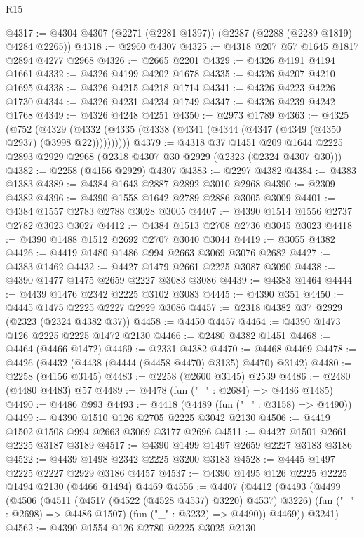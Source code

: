 \begin{lexlean}{R15}
\begin{coremodule}
@4317 := @4304 @4307 (@2271 (@2281 @1397)) (@2287 (@2288 (@2289 @1819) @4284 @2265))
@4318 := @2960 @4307
@4325 := @4318 @207 @57 @1645 @1817 @2894 @4277 @2968
@4326 := @2665 @2201
@4329 := @4326 @4191 @4194 @1661
@4332 := @4326 @4199 @4202 @1678
@4335 := @4326 @4207 @4210 @1695
@4338 := @4326 @4215 @4218 @1714
@4341 := @4326 @4223 @4226 @1730
@4344 := @4326 @4231 @4234 @1749
@4347 := @4326 @4239 @4242 @1768
@4349 := @4326 @4248 @4251
@4350 := @2973 @1789
@4363 := @4325
    (@752 (@4329 (@4332 (@4335 (@4338 (@4341 (@4344 (@4347 (@4349 (@4350 @2937) (@3998 @22))))))))))
@4379 := @4318
    @37
    @1451
    @209
    @1644
    @2225
    @2893
    @2929
    @2968
    (@2318 @4307 @30 @2929 (@2323 (@2324 @4307 @30)))
@4382 := @2258 (@4156 @2929) @4307
@4383 := @2297 @4382
@4384 := @4383 @1383
@4389 := @4384 @1643 @2887 @2892 @3010 @2968
@4390 := @2309 @4382
@4396 := @4390 @1558 @1642 @2789 @2886 @3005 @3009
@4401 := @4384 @1557 @2783 @2788 @3028 @3005
@4407 := @4390 @1514 @1556 @2737 @2782 @3023 @3027
@4412 := @4384 @1513 @2708 @2736 @3045 @3023
@4418 := @4390 @1488 @1512 @2692 @2707 @3040 @3044
@4419 := @3055 @4382
@4426 := @4419 @1480 @1486 @994 @2663 @3069 @3076 @2682
@4427 := @4383 @1462
@4432 := @4427 @1479 @2661 @2225 @3087 @3090
@4438 := @4390 @1477 @1475 @2659 @2227 @3083 @3086
@4439 := @4383 @1464
@4444 := @4439 @1476 @2342 @2225 @3102 @3083
@4445 := @4390 @351
@4450 := @4445 @1475 @2225 @2227 @2929 @3086
@4457 := @2318 @4382 @37 @2929 (@2323 (@2324 @4382 @37))
@4458 := @4450 @4457
@4464 := @4390 @1473 @126 @2225 @2225 @1472 @2130
@4466 := @2480 @4382 @1451
@4468 := @4464 (@4466 @1472)
@4469 := @2331 @4382
@4470 := @4468 @4469
@4478 := @4426 (@4432 (@4438 (@4444 (@4458 @4470) @3135) @4470) @3142)
@4480 := @2258 (@4156 @3145)
@4483 := @2258 (@2600 @3145) @2539
@4486 := @2480 (@4480 @4483) @57
@4489 := @4478 (fun ("_" : @2684) => @4486 @1485)
@4490 := @4486 @993
@4493 := @4418 (@4489 (fun ("_" : @3158) => @4490))
@4499 := @4390 @1510 @126 @2705 @2225 @3042 @2130
@4506 := @4419 @1502 @1508 @994 @2663 @3069 @3177 @2696
@4511 := @4427 @1501 @2661 @2225 @3187 @3189
@4517 := @4390 @1499 @1497 @2659 @2227 @3183 @3186
@4522 := @4439 @1498 @2342 @2225 @3200 @3183
@4528 := @4445 @1497 @2225 @2227 @2929 @3186 @4457
@4537 := @4390 @1495 @126 @2225 @2225 @1494 @2130 (@4466 @1494) @4469
@4556 := @4407
    (@4412
      (@4493
        (@4499
          (@4506
            (@4511 (@4517 (@4522 (@4528 @4537) @3220) @4537) @3226)
            (fun ("_" : @2698) => @4486 @1507)
            (fun ("_" : @3232) => @4490))
          @4469))
      @3241)
@4562 := @4390 @1554 @126 @2780 @2225 @3025 @2130

\end{coremodule}
\end{lexlean}
